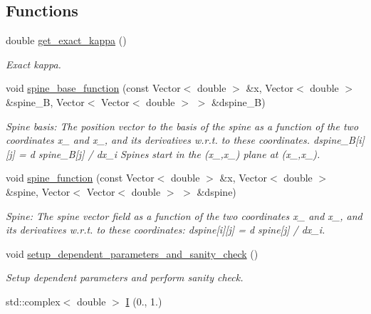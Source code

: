 \subsection*{Functions}
\begin{DoxyCompactItemize}
\item 
double \hyperlink{namespaceGlobalParameters_a4571d41514b16946dd31d075d44c5593}{get\+\_\+exact\+\_\+kappa} ()
\begin{DoxyCompactList}\small\item\em Exact kappa. \end{DoxyCompactList}\item 
void \hyperlink{namespaceGlobalParameters_ac81daf87f8d3f075d9fd108427e70c4f}{spine\+\_\+base\+\_\+function} (const Vector$<$ double $>$ \&x, Vector$<$ double $>$ \&spine\+\_\+B, Vector$<$ Vector$<$ double $>$ $>$ \&dspine\+\_\+B)
\begin{DoxyCompactList}\small\item\em Spine basis\+: The position vector to the basis of the spine as a function of the two coordinates x\+\_ and x\+\_, and its derivatives w.\+r.\+t. to these coordinates. dspine\+\_\+B\mbox{[}i\mbox{]}\mbox{[}j\mbox{]} = d spine\+\_\+B\mbox{[}j\mbox{]} / dx\+\_\+i Spines start in the (x\+\_,x\+\_) plane at (x\+\_,x\+\_). \end{DoxyCompactList}\item 
void \hyperlink{namespaceGlobalParameters_a82df8c67f58e78a236fb6a0cc8bf8284}{spine\+\_\+function} (const Vector$<$ double $>$ \&x, Vector$<$ double $>$ \&spine, Vector$<$ Vector$<$ double $>$ $>$ \&dspine)
\begin{DoxyCompactList}\small\item\em Spine\+: The spine vector field as a function of the two coordinates x\+\_ and x\+\_, and its derivatives w.\+r.\+t. to these coordinates\+: dspine\mbox{[}i\mbox{]}\mbox{[}j\mbox{]} = d spine\mbox{[}j\mbox{]} / dx\+\_\+i. \end{DoxyCompactList}\item 
void \hyperlink{namespaceGlobalParameters_aedbc21f2c81d445634badfc5cdd77436}{setup\+\_\+dependent\+\_\+parameters\+\_\+and\+\_\+sanity\+\_\+check} ()
\begin{DoxyCompactList}\small\item\em Setup dependent parameters and perform sanity check. \end{DoxyCompactList}\item 
std\+::complex$<$ double $>$ \hyperlink{namespaceGlobalParameters_a7642bd7303d39de0d680340586b7df60}{I} (0., 1.)

\end{DoxyCompactItemize}
